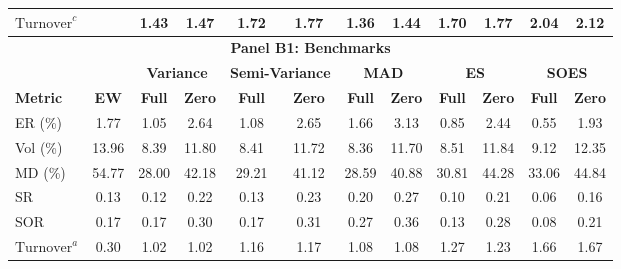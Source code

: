 \begin{table}[tbp]
{\begin{tabular}{l*{11}{c}}
    $\text{Turnover}^c$      &                  & 1.43             & 1.47             & 1.72             & 1.77             & 1.36             & 1.44             & 1.70             & 1.77             & 2.04             & 2.12 \\
    \midrule
    \multicolumn{12}{c}{\textbf{Panel B1: Benchmarks}} \\
    \midrule
                             &                  & \multicolumn{2}{c}{\textbf{Variance}} & \multicolumn{2}{c}{\textbf{Semi-Variance}} & \multicolumn{2}{c}{\textbf{MAD}} & \multicolumn{2}{c}{\textbf{ES}} & \multicolumn{2}{c}{\textbf{SOES}} \\
    \cmidrule(lr){3-4} \cmidrule(lr){5-6} \cmidrule(lr){7-8} \cmidrule(lr){9-10} \cmidrule(lr){11-12}
    \textbf{Metric}          & \textbf{EW}      & \textbf{Full}    & \textbf{Zero}    & \textbf{Full}    & \textbf{Zero}    & \textbf{Full}    & \textbf{Zero}    & \textbf{Full}    & \textbf{Zero}    & \textbf{Full}    & \textbf{Zero} \\
    \midrule
    ER (\%)                  & 1.77             & 1.05             & 2.64             & 1.08             & 2.65             & 1.66             & 3.13             & 0.85             & 2.44             & 0.55             & 1.93 \\
    Vol (\%)                 & 13.96            & 8.39             & 11.80            & 8.41             & 11.72            & 8.36             & 11.70            & 8.51             & 11.84            & 9.12             & 12.35 \\
    MD (\%)                  & 54.77            & 28.00            & 42.18            & 29.21            & 41.12            & 28.59            & 40.88            & 30.81            & 44.28            & 33.06            & 44.84 \\
    SR                       & 0.13             & 0.12             & 0.22             & 0.13             & 0.23             & 0.20             & 0.27             & 0.10             & 0.21             & 0.06             & 0.16 \\
    SOR                      & 0.17             & 0.17             & 0.30             & 0.17             & 0.31             & 0.27             & 0.36             & 0.13             & 0.28             & 0.08             & 0.21 \\
    $\text{Turnover}^a$      & 0.30             & 1.02             & 1.02             & 1.16             & 1.17             & 1.08             & 1.08             & 1.27             & 1.23             & 1.66             & 1.67 \\

\end{tabular}}
\end{table}
